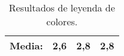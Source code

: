 \begin{table}[H]
{\begin{tabular}{c|ccc|}
            \multicolumn{1}{|c|}{\textbf{Media:}}    & \multicolumn{1}{c|}{\textbf{2,6}}                                                                                                                                            & \multicolumn{1}{c|}{\textbf{2,8}}                                                                                                                                                                     & \textbf{2,8}                                                                                                                                                                                                         \\ \hline
        \end{tabular}
    }
    \caption{Resultados de leyenda de colores.}
    \label{tab:resultadosLeyendaColores}
\end{table}

